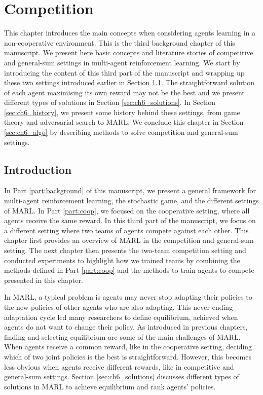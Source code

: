 \chapter{Competition}\label{ch:competition}
\begin{chapter_outline}

This chapter introduces the main concepts when considering agents learning in a non-cooperative environment.
This is the third background chapter of this manuscript.
We present here basic concepts and literature stories of competitive and general-sum settings in multi-agent reinforcement learning.
We start by introducing the content of this third part of the manuscript and wrapping up these two settings introduced earlier in Section \ref{sec:ch6_intro}.
The straightforward solution of each agent maximising its own reward may not be the best and we present different types of solutions in Section \ref{sec:ch6_solutions}.
In Section \ref{sec:ch6_history}, we present some history behind these settings, from game theory and adversarial search to MARL.
We conclude this chapter in Section \ref{sec:ch6_algo} by describing methods to solve competition and general-sum settings.

\end{chapter_outline}

\section{Introduction}\label{sec:ch6_intro}
In Part \ref{part:background} of this manuscript, we present a general framework for multi-agent reinforcement learning, the stochastic game, and the different settings of MARL.
In Part \ref{part:coop}, we focused on the cooperative setting, where all agents receive the same reward.
In this third part of the manuscript, we focus on a different setting where two teams of agents compete against each other.
This chapter first provides an overview of MARL in the competition and general-sum setting.
The next chapter then presents the two-team competition setting and conducted experiments to highlight how we trained teams by combining the methods defined in Part \ref{part:coop} and the methods to train agents to compete presented in this chapter.

In MARL, a typical problem is agents may never stop adapting their policies to the new policies of other agents who are also adapting.
This never-ending adaptation cycle led many researchers to define equilibrium, achieved when agents do not want to change their policy.
As introduced in previous chapters, finding and selecting equilibrium are some of the main challenges of MARL.
When agents receive a common reward, like in the cooperative setting, deciding which of two joint policies is the best is straightforward.
However, this becomes less obvious when agents receive different rewards, like in competitive and general-sum settings.
Section \ref{sec:ch6_solutions} discusses different types of solutions in MARL to achieve equilibrium and rank agents' policies.

